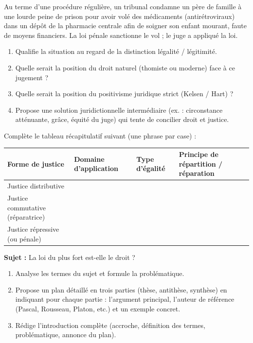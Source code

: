 \documentclass[11pt]{article}
\newcommand{\cle}[1]{{\popxbold\color{popdark}#1}}
\newcounter{popsec}
\newcounter{popsub}
\newcommand{\courssub}[1]{%
  \stepcounter{popsub}%
  \par\vspace{9pt}\noindent{\popxbold\fontsize{11.5}{13}\selectfont\color{popink}{\color{poporange}\thepopsec.\thepopsub}\hspace{6pt}#1}\par\nopagebreak\vspace{4pt}
}
\begin{document}
\begin{exercice}
Au terme d'une procédure régulière, un tribunal condamne un père de famille à une lourde peine de prison pour avoir volé des médicaments (antirétroviraux) dans un dépôt de la pharmacie centrale afin de soigner son enfant mourant, faute de moyens financiers. La loi pénale sanctionne le vol ; le juge a appliqué la loi.
\begin{enumerate}
    \item Qualifie la situation au regard de la distinction \cle{légalité} / \cle{légitimité}.
    \item Quelle serait la position du \cle{droit naturel} (thomiste ou moderne) face à ce jugement ?
    \item Quelle serait la position du \cle{positivisme juridique} strict (Kelsen / Hart) ?
    \item Propose une solution juridictionnelle intermédiaire (ex. : circonstance atténuante, grâce, équité du juge) qui tente de concilier droit et justice.
\end{enumerate}
\end{exercice}

\begin{exercice}
Complète le tableau récapitulatif suivant (une phrase par case) :

\begin{center}
\begin{tabularx}{\linewidth}{|l|X|X|X|}
\hline
\rowcolor{popblueL}
\textbf{Forme de justice} & \textbf{Domaine d'application} & \textbf{Type d'égalité} & \textbf{Principe de répartition / réparation} \\
\hline
Justice distributive &  &  &  \\
\hline
Justice commutative (réparatrice) &  &  &  \\
\hline
Justice répressive (ou pénale) &  &  &  \\
\hline
\end{tabularx}
\end{center}
\end{exercice}

\courssub{Je me prépare au Bac}

\begin{exercice}
\textbf{Sujet :} \guillemotleft La loi du plus fort est-elle le droit ? \guillemotright
\begin{enumerate}
    \item Analyse les termes du sujet et formule la problématique.
    \item Propose un plan détaillé en trois parties (thèse, antithèse, synthèse) en indiquant pour chaque partie : l'argument principal, l'auteur de référence (Pascal, Rousseau, Platon, etc.) et un exemple concret.
    \item Rédige l'introduction complète (accroche, définition des termes, problématique, annonce du plan).
\end{enumerate}
\end{exercice}
\end{document}
